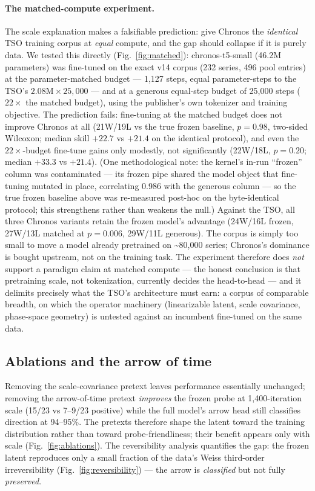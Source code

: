 \documentclass[11pt]{article}
\begin{document}
\paragraph{The matched-compute experiment.}
The scale explanation makes a falsifiable prediction: give Chronos the
\emph{identical} TSO training corpus at \emph{equal} compute, and the gap
should collapse if it is purely data. We tested this directly
(Fig.~\ref{fig:matched}): chronos-t5-small (46.2M parameters) was
fine-tuned on the exact v14 corpus (232 series, 496 pool entries) at the
parameter-matched budget --- 1{,}127 steps, equal parameter-steps to the
TSO's $2.08\text{M} \times 25{,}000$ --- and at a generous equal-step
budget of 25{,}000 steps ($22\times$ the matched budget), using the
publisher's own tokenizer and training objective. The prediction fails:
fine-tuning at the matched budget does not improve Chronos at all
(21W/19L vs the true frozen baseline, $p=0.98$, two-sided Wilcoxon;
median skill $+22.7$ vs $+21.4$ on the identical protocol), and even the
$22\times$-budget fine-tune gains only modestly, not significantly
(22W/18L, $p=0.20$; median $+33.3$ vs $+21.4$). (One methodological
note: the kernel's in-run ``frozen'' column was contaminated --- its
frozen pipe shared the model object that fine-tuning mutated in place,
correlating 0.986 with the generous column --- so the true frozen
baseline above was re-measured post-hoc on the byte-identical protocol;
this strengthens rather than weakens the null.) Against the TSO, all
three Chronos variants retain the frozen model's advantage (24W/16L
frozen, 27W/13L matched at $p=0.006$, 29W/11L generous). The
corpus is simply too small to move a model already pretrained on
\textasciitilde 80{,}000 series; Chronos's dominance is bought upstream,
not on the training task. The experiment therefore does \emph{not}
support a paradigm claim at matched compute --- the honest conclusion is
that pretraining scale, not tokenization, currently decides the
head-to-head --- and it delimits precisely what the TSO's architecture
must earn: a corpus of comparable breadth, on which the operator
machinery (linearizable latent, scale covariance, phase-space geometry)
is untested against an incumbent fine-tuned on the same data.

\subsection{Ablations and the arrow of time}
\label{sec:ablations}
Removing the scale-covariance pretext leaves performance essentially
unchanged; removing the arrow-of-time pretext \emph{improves} the frozen
probe at 1{,}400-iteration scale (15/23 vs 7--9/23 positive) while the full
model's arrow head still classifies direction at 94--95\%. The pretexts
therefore shape the latent toward the training distribution rather than
toward probe-friendliness; their benefit appears only with scale
(Fig.~\ref{fig:ablations}). The reversibility analysis quantifies the gap:
the frozen latent reproduces only a small fraction of the data's Weiss
third-order irreversibility (Fig.~\ref{fig:reversibility}) --- the arrow is
\emph{classified} but not fully \emph{preserved}.
\end{document}
